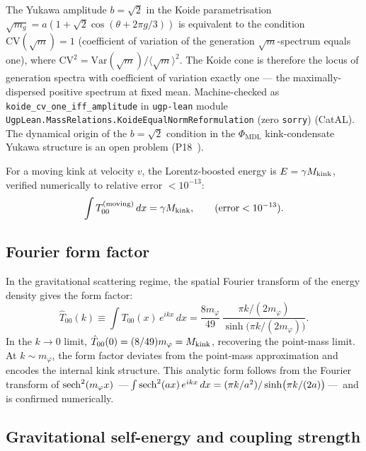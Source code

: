 \documentclass[11pt]{article}
\theoremstyle{remark}
\newcommand{\Mkink}{M_{\rm kink}}
\begin{document}
The Yukawa amplitude $b = \sqrt{2}$ in the Koide parametrisation $\sqrt{m_g} = a(1 + \sqrt{2}\cos(\theta + 2\pi g/3))$ is equivalent to the condition $\mathrm{CV}(\sqrt{m}) = 1$ (coefficient of variation of the generation $\sqrt{m}$-spectrum equals one), where $\mathrm{CV}^2 = \mathrm{Var}(\sqrt{m})/\langle\sqrt{m}\rangle^2$.  The Koide cone is therefore the locus of generation spectra with coefficient of variation exactly one --- the maximally-dispersed positive spectrum at fixed mean.  Machine-checked as \texttt{koide\_cv\_one\_iff\_amplitude} in \texttt{ugp-lean} module \texttt{UgpLean.MassRelations.KoideEqualNormReformulation} (zero \texttt{sorry}) (CatAL).  The dynamical origin of the $b = \sqrt{2}$ condition in the $\Phi_{\mathrm{MDL}}$ kink-condensate Yukawa structure is an open problem (P18~\cite{Spivack2026_Koide}).

For a moving kink at velocity $v$, the Lorentz-boosted energy is $E = \gamma\Mkink$,
verified numerically to relative error $< 10^{-13}$:
\begin{equation}
  \int T_{00}^{(\rm moving)}\,dx = \gamma\Mkink, \qquad (\text{error} < 10^{-13}).
\label{eq:moving_kink}
\end{equation}

\subsection{Fourier form factor}

In the gravitational scattering regime, the spatial Fourier transform of the
energy density gives the form factor:
\begin{equation}
  \hat{T}_{00}(k) \equiv \int T_{00}(x)\,e^{ikx}\,dx
  = \frac{8m_\varphi}{49}\,\frac{\pi k/(2m_\varphi)}{\sinh\bigl(\pi k/(2m_\varphi)\bigr)}.
\label{eq:formfactor}
\end{equation}
In the $k\to 0$ limit, $\hat{T}_{00}(0) = (8/49)m_\varphi = \Mkink$,
recovering the point-mass limit.
At $k \sim m_\varphi$, the form factor deviates from the point-mass approximation
and encodes the internal kink structure.
This analytic form follows from the Fourier transform of ${\rm sech}^2(m_\varphi x)$
\,---\,$\int {\rm sech}^2(ax)\,e^{ikx}\,dx = (\pi k/a^2)/\sinh\bigl(\pi k/(2a)\bigr)$\,---\,%
and is confirmed numerically.

\subsection{Gravitational self-energy and coupling strength}
\end{document}
